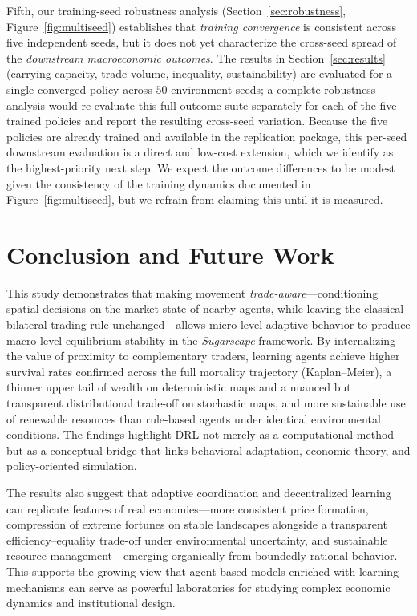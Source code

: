 \documentclass[pdflatex,sn-mathphys-num]{sn-jnl}%
\theoremstyle{thmstyleone}%
\theoremstyle{thmstyletwo}%
\theoremstyle{thmstylethree}%
\begin{document}
Fifth, our training-seed robustness analysis (Section~\ref{sec:robustness}, Figure~\ref{fig:multiseed}) establishes that \emph{training convergence} is consistent across five independent seeds, but it does not yet characterize the cross-seed spread of the \emph{downstream macroeconomic outcomes}.  
The results in Section~\ref{sec:results} (carrying capacity, trade volume, inequality, sustainability) are evaluated for a single converged policy across $50$ environment seeds; a complete robustness analysis would re-evaluate this full outcome suite separately for each of the five trained policies and report the resulting cross-seed variation.  
Because the five policies are already trained and available in the replication package, this per-seed downstream evaluation is a direct and low-cost extension, which we identify as the highest-priority next step.  
We expect the outcome differences to be modest given the consistency of the training dynamics documented in Figure~\ref{fig:multiseed}, but we refrain from claiming this until it is measured.

\section{Conclusion and Future Work}

This study demonstrates that making movement \emph{trade-aware}---conditioning spatial decisions on the market state of nearby agents, while leaving the classical bilateral trading rule unchanged---allows micro-level adaptive behavior to produce macro-level equilibrium stability in the \textit{Sugarscape} framework.  
By internalizing the value of proximity to complementary traders, learning agents achieve higher survival rates confirmed across the full mortality trajectory (Kaplan--Meier), a thinner upper tail of wealth on deterministic maps and a nuanced but transparent distributional trade-off on stochastic maps, and more sustainable use of renewable resources than rule-based agents under identical environmental conditions.  
The findings highlight DRL not merely as a computational method but as a conceptual bridge that links behavioral adaptation, economic theory, and policy-oriented simulation.

The results also suggest that adaptive coordination and decentralized learning can replicate features of real economies---more consistent price formation, compression of extreme fortunes on stable landscapes alongside a transparent efficiency--equality trade-off under environmental uncertainty, and sustainable resource management---emerging organically from boundedly rational behavior.  
This supports the growing view that agent-based models enriched with learning mechanisms can serve as powerful laboratories for studying complex economic dynamics and institutional design.
\end{document}
